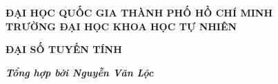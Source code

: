 \documentclass[12pt,a4paper]{book}
\begin{document}
\begin{titlepage}
\begin{center}
\textbf{ĐẠI HỌC QUỐC GIA THÀNH PHỐ HỒ CHÍ MINH}\\
\textbf{TRƯỜNG ĐẠI HỌC KHOA HỌC TỰ NHIÊN}
\end{center}
\vspace{4 cm}
\begin{center}
\fontsize{20}{16}\selectfont
\centerline{\textbf{ĐẠI SỐ TUYẾN TÍNH}}
\end{center}

\vspace{14 cm}
\centerline{\textbf{\textit{Tổng hợp bởi Nguyễn Văn Lộc}}}
\end{titlepage}
\tableofcontents
\newpage




\end{document}

